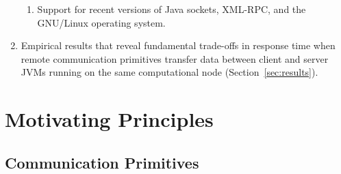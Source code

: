 \documentclass{sig-alternate}
\begin{document}
\begin{enumerate}
\begin{enumerate}
\item Support for recent versions of Java sockets, XML-RPC, and the
  GNU/Linux operating system.

\end{enumerate}

\item Empirical results that reveal fundamental trade-offs in response
  time when remote communication primitives transfer data between
  client and server JVMs running on the same computational node
  (Section~\ref{sec:results}).
 

\end{enumerate}



\section{Motivating Principles}
\label{sec:background}

\subsection{Communication Primitives}
\label{sec:comm-prim}




\end{document}
